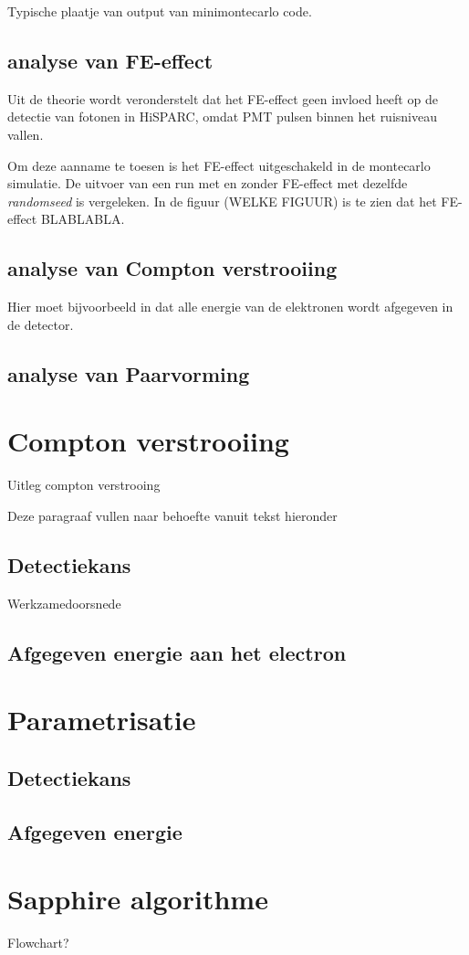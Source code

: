 \documentclass[a4paper,11pt]{article}
\begin{document}
Typische plaatje van output van minimontecarlo code.

\subsection{analyse van FE-effect}
Uit de theorie wordt veronderstelt dat het FE-effect geen invloed heeft op de detectie van fotonen in HiSPARC, omdat PMT pulsen binnen het ruisniveau vallen.

Om deze aanname te toesen is het FE-effect uitgeschakeld in de montecarlo simulatie. De uitvoer van een run met en zonder FE-effect met dezelfde \textit{randomseed} is vergeleken. In de figuur (WELKE FIGUUR) is te zien dat het FE-effect BLABLABLA.

\subsection{analyse van Compton verstrooiing}
Hier moet bijvoorbeeld in dat alle energie van de elektronen wordt afgegeven in de detector.
\subsection{analyse van Paarvorming}

\section{Compton verstrooiing}
Uitleg compton verstrooing

Deze paragraaf vullen naar behoefte vanuit tekst hieronder
\subsection{Detectiekans}
Werkzamedoorsnede
\subsection{Afgegeven energie aan het electron}

\section{Parametrisatie}
\subsection{Detectiekans}
\subsection{Afgegeven energie}

\section{Sapphire algorithme}
Flowchart?


{}

\end{document}
